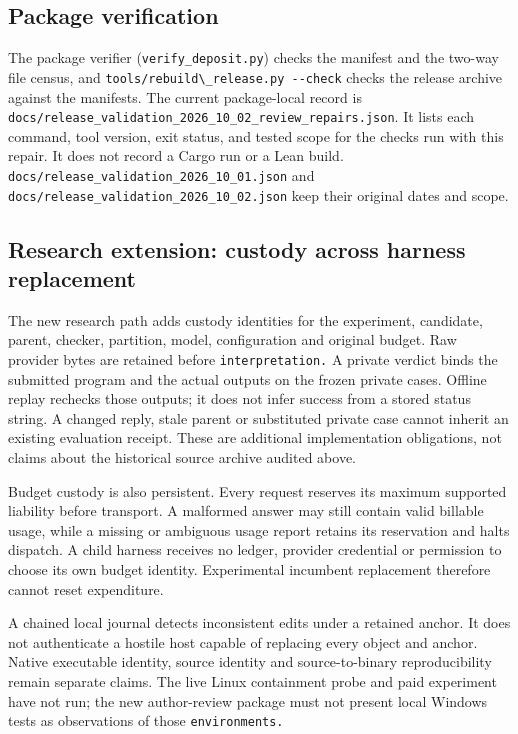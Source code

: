 \documentclass[
  11pt,
]{article}
\newcommand{\passthrough}[1]{#1}
\begin{document}
\subsection{Package verification}\label{package-verification}

The package verifier (\nolinkurl{verify_deposit.py}) checks the manifest
and the two-way file census, and
\passthrough{\lstinline!tools/rebuild\_release.py --check!} checks the
release archive against the manifests. The current package-local record
is \nolinkurl{docs/release_validation_2026_10_02_review_repairs.json}.
It lists each command, tool version, exit status, and tested scope for
the checks run with this repair. It does not record a Cargo run or a
Lean build. \nolinkurl{docs/release_validation_2026_10_01.json} and
\nolinkurl{docs/release_validation_2026_10_02.json} keep their original
dates and scope.

\subsection{Research extension: custody across harness
replacement}\label{research-extension-custody-across-harness-replacement}

The new research path adds custody identities for the experiment,
candidate, parent, checker, partition, model, configuration and original
budget. Raw provider bytes are retained before
\nolinkurl{interpretation.} A private verdict binds the submitted
program and the actual outputs on the frozen private cases. Offline
replay rechecks those outputs; it does not infer success from a stored
status string. A changed reply, stale parent or substituted private case
cannot inherit an existing evaluation receipt. These are additional
implementation obligations, not claims about the historical source
archive audited above.

Budget custody is also persistent. Every request reserves its maximum
supported liability before transport. A malformed answer may still
contain valid billable usage, while a missing or ambiguous usage report
retains its reservation and halts dispatch. A child harness receives no
ledger, provider credential or permission to choose its own budget
identity. Experimental incumbent replacement therefore cannot reset
expenditure.

A chained local journal detects inconsistent edits under a retained
anchor. It does not authenticate a hostile host capable of replacing
every object and anchor. Native executable identity, source identity and
source-to-binary reproducibility remain separate claims. The live Linux
containment probe and paid experiment have not run; the new
author-review package must not present local Windows tests as
observations of those \nolinkurl{environments.}
\end{document}
